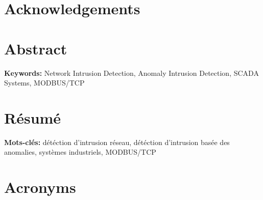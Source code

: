 \documentclass[11pt,]{article}
\begin{document}
\thispagestyle{empty} \newpage
\mbox{} \thispagestyle{empty}

\newpage

\section*{Acknowledgements}\label{acknowledgements}

\newpage
\mbox{} \thispagestyle{empty}

\clearpage

\section*{Abstract}\label{abstract}

\textbf{Keywords: }Network Intrusion Detection, Anomaly Intrusion
Detection, SCADA Systems, MODBUS/TCP

\newpage
\mbox{} \thispagestyle{empty}

\clearpage

\section*{Résumé}\label{resume}

\textbf{Mots-clés: }détéction d'intrusion réseau, détéction d'intrusion
basée des anomalies, systèmes industriels, MODBUS/TCP

\newpage
\mbox{} \thispagestyle{empty}

\clearpage

\tableofcontents

\cleardoublepage

\listoffigures

\cleardoublepage

\listoftables

\newpage

\section*{Acronyms}\label{acronyms}
\end{document}
